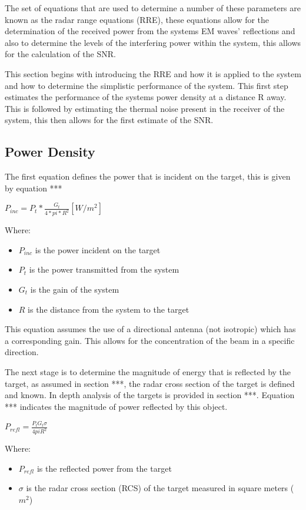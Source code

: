 \documentclass[11pt]{witseiepaper}
\begin{document}
The set of equations that are used to determine a number of these parameters are known as the radar range equations (RRE), these equations allow for the determination of the received power from the systems EM waves' reflections and also to determine the levels of the interfering power within the system, this allows for the calculation of the SNR.

This section begins with introducing the RRE and how it is applied to the system and how to determine the simplistic performance of the system. This first step estimates the performance of the systems power density at a distance R away. This is followed by estimating the thermal noise present in the receiver of the system, this then allows for the first estimate of the SNR. 

\subsection{Power Density}

The first equation defines the power that is incident on the target, this is given by equation ***

$P_{inc} = P_t * \frac{G_{t}}{4 * pi * R^2} [W/m^2]$

Where:
\begin{itemize}
    \item $P_{inc}$ is the power incident on the target
    \item $P_t$ is the power transmitted from the system
    \item $G_t$ is the gain of the system
    \item $R$ is the distance from the system to the target
\end{itemize}

This equation assumes the use of a directional antenna (not isotropic) which has a corresponding gain. This allows for the concentration of the beam in a specific direction.

The next stage is to determine the magnitude of energy that is reflected by the target, as assumed in section ***, the radar cross section of the target is defined and known. 
In depth analysis of the targets is provided in section ***.
Equation *** indicates the magnitude of power reflected by this object.

$P_{refl} = \frac{P_{t} G_{t} \sigma}{4 pi R^2}$

Where:
\begin{itemize}
    \item $P_{refl}$ is the reflected power from the target
    \item $\sigma$ is the radar cross section (RCS) of the target measured in square meters ($m^2$)
\end{itemize}
\end{document}
